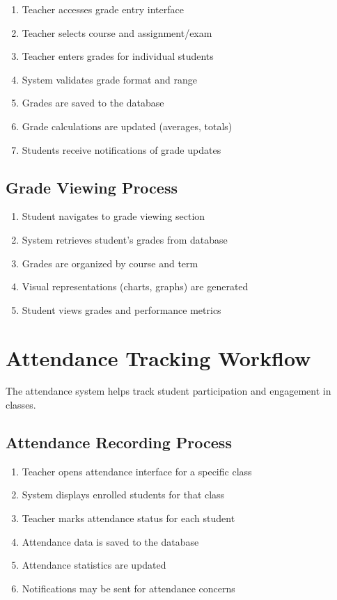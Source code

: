 \begin{enumerate}
    \item Teacher accesses grade entry interface
    \item Teacher selects course and assignment/exam
    \item Teacher enters grades for individual students
    \item System validates grade format and range
    \item Grades are saved to the database
    \item Grade calculations are updated (averages, totals)
    \item Students receive notifications of grade updates
\end{enumerate}

\subsection{Grade Viewing Process}

\begin{enumerate}
    \item Student navigates to grade viewing section
    \item System retrieves student's grades from database
    \item Grades are organized by course and term
    \item Visual representations (charts, graphs) are generated
    \item Student views grades and performance metrics
\end{enumerate}

\section{Attendance Tracking Workflow}

The attendance system helps track student participation and engagement in classes.

\subsection{Attendance Recording Process}

\begin{enumerate}
    \item Teacher opens attendance interface for a specific class
    \item System displays enrolled students for that class
    \item Teacher marks attendance status for each student
    \item Attendance data is saved to the database
    \item Attendance statistics are updated
    \item Notifications may be sent for attendance concerns
\end{enumerate}

